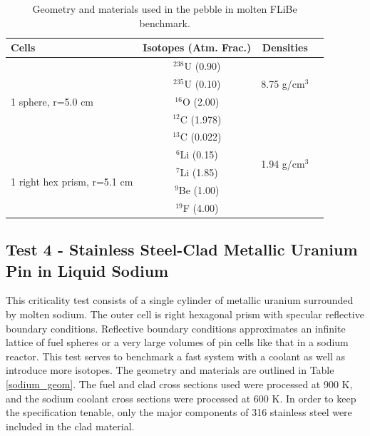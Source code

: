 \documentclass[preprint,12pt]{elsarticle}
\begin{document}
\begin{table}[h]
\centering
\caption{Geometry and materials used in the pebble in molten FLiBe benchmark.}
\label{pebble_geom}
\begin{tabular}{| l | c | c | c |}
\hline
Cells & Isotopes (Atm. Frac.)& Densities \\
\hline
\multirow{5}{*}{1 sphere, r=5.0 cm }  &   $^{238}$U   (0.90) &    \multirow{3}{*}{8.75 g/cm$^3$} \\
                                     &   $^{235}$U   (0.10) & \\
                                     &   $^{16}$O    (2.00) & \\
                                     &   $^{12}$C    (1.978)& \\
                                     &   $^{13}$C    (0.022)& \\
\hline
\multirow{4}{*}{1 right hex prism, r=5.1 cm }  &   $^{6}$Li  (0.15) &    \multirow{2}{*}{1.94 g/cm$^3$} \\
                                               &  $^{7}$Li  (1.85)& \\
                                               &  $^{9}$Be  (1.00) & \\
                                               &  $^{19}$F  (4.00) & \\
\hline
\end{tabular}
\end{table}

\subsection{Test 4 - Stainless Steel-Clad Metallic Uranium Pin in Liquid Sodium}

This criticality test consists of a single cylinder of metallic uranium surrounded by molten sodium.  The outer cell is right hexagonal prism with specular reflective boundary conditions.  Reflective boundary conditions approximates an infinite lattice of fuel spheres or a very large volumes of  pin cells like that in a sodium reactor.  This test serves to benchmark a fast system with a coolant as well as introduce more isotopes.  The geometry and materials are outlined in Table \ref{sodium_geom}.  The fuel and clad cross sections used were processed at 900 K, and the sodium coolant cross sections were processed at 600 K.  In order to keep the specification tenable, only the major components of 316 stainless steel were included in the clad material. 
\end{document}
